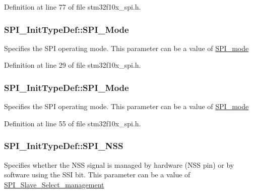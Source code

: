 Definition at line 77 of file stm32f10x\+\_\+spi.\+h.

\subsubsection[{\texorpdfstring{S\+P\+I\+\_\+\+Mode}{SPI_Mode}}]{ S\+P\+I\+\_\+\+Init\+Type\+Def\+::\+S\+P\+I\+\_\+\+Mode}\hypertarget{struct_s_p_i___init_type_def_a9df59619a50a3ce9c3cf23e6e04fe9ec}{}\label{struct_s_p_i___init_type_def_a9df59619a50a3ce9c3cf23e6e04fe9ec}
Specifies the S\+PI operating mode. This parameter can be a value of \hyperlink{group___s_p_i__mode}{S\+P\+I\+\_\+mode} 

Definition at line 29 of file stm32f10x\+\_\+spi.\+h.

\subsubsection[{\texorpdfstring{S\+P\+I\+\_\+\+Mode}{SPI_Mode}}]{ S\+P\+I\+\_\+\+Init\+Type\+Def\+::\+S\+P\+I\+\_\+\+Mode}\hypertarget{struct_s_p_i___init_type_def_a578435d3b3a17baa5d5ff87447aa697f}{}\label{struct_s_p_i___init_type_def_a578435d3b3a17baa5d5ff87447aa697f}
Specifies the S\+PI operating mode. This parameter can be a value of \hyperlink{group___s_p_i__mode}{S\+P\+I\+\_\+mode} 

Definition at line 55 of file stm32f10x\+\_\+spi.\+h.

\subsubsection[{\texorpdfstring{S\+P\+I\+\_\+\+N\+SS}{SPI_NSS}}]{ S\+P\+I\+\_\+\+Init\+Type\+Def\+::\+S\+P\+I\+\_\+\+N\+SS}\hypertarget{struct_s_p_i___init_type_def_a9234e09656fe5c6805ed18a25681e6cb}{}\label{struct_s_p_i___init_type_def_a9234e09656fe5c6805ed18a25681e6cb}
Specifies whether the N\+SS signal is managed by hardware (N\+SS pin) or by software using the S\+SI bit. This parameter can be a value of \hyperlink{group___s_p_i___slave___select__management}{S\+P\+I\+\_\+\+Slave\+\_\+\+Select\+\_\+management} 

